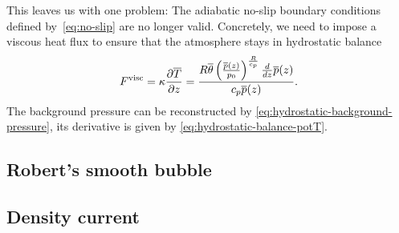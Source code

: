 This leaves us with one problem:
The adiabatic no-slip boundary conditions defined by~\vref{eq:no-slip} are no longer valid.
Concretely, we need to impose a viscous heat flux to ensure that the atmosphere stays in hydrostatic balance~\cite{giraldo2008study}
\begin{equation}
  \label{eq:atmosphere-bc}
  F^\text{visc} = \kappa \pdv{\overline{T}}{z} =
\frac{R \overline{\theta} \left(\frac{\overline{p}{\left (z \right )}}{p_{0}}\right)^{\frac{R}{c_{p}}} \frac{d}{d z} \overline{p}{\left (z \right )}}{c_{p} \overline{p}{\left (z \right )}}.
\end{equation}
The background pressure can be reconstructed by \cref{eq:hydrostatic-background-pressure}, its derivative is given by \cref{eq:hydrostatic-balance-potT}.

\subsection{Robert's smooth bubble}
\cite{robert1993bubble}
\subsection{Density current}
\cite{straka1993numerical}

